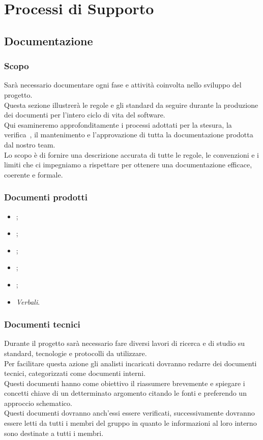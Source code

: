 \section{Processi di Supporto}\label{sup}

\subsection{Documentazione}
\subsubsection{Scopo}
Sarà necessario documentare ogni fase e attività coinvolta nello sviluppo del progetto.\\
Questa sezione illustrerà le regole e gli standard da seguire durante la produzione 
dei documenti per l'intero ciclo di vita del software. \\
Qui esamineremo approfonditamente i processi adottati per la stesura, la verifica\glo\ , il mantenimento e l’approvazione di tutta la documentazione prodotta dal nostro team. \\
Lo scopo è di fornire una descrizione accurata di tutte le regole, le convenzioni e i limiti che ci impegniamo a rispettare per ottenere una documentazione efficace, coerente e formale.\\

\subsubsection{Documenti prodotti}
\begin{itemize}
    \item \NdPdocumento;
    \item \Glodocumento;
    \item \PdPdocumento;
    \item \PdQdocumento;
    \item \AdRdocumento;
    \item \textit{Verbali}.
\end{itemize}

\subsubsection{Documenti tecnici}\label{doctec}
Durante il progetto sarà necessario fare diversi lavori di ricerca e di studio su standard, tecnologie e protocolli da utilizzare.\\
Per facilitare questa azione gli analisti incaricati dovranno redarre dei documenti tecnici, categorizzati come documenti interni.\\
Questi documenti hanno come obiettivo il riassumere brevemente e spiegare i concetti chiave di un detterminato argomento citando le fonti e preferendo un approccio schematico.\\
Questi documenti dovranno anch'essi essere verificati, successivamente dovranno essere letti da tutti i membri del gruppo in quanto le informazioni
al loro interno sono destinate a tutti i membri.

